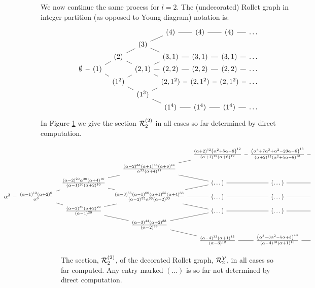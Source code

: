 \documentclass{article}
\theoremstyle{definition}
\numberwithin{equation}{subsection}
\begin{document}
We now continue the same process for $l=2$.
The (undecorated) Rollet graph in integer-partition (as opposed to Young diagram) notation is:
\[
\begin{tikzcd}[column sep=0.6em,row sep=0em]
&&&&(4)\ar[dash,r]&(4)\ar[dash,r]&(4)\ar[dash,r]&\dots\\
&&&(3)\ar[dash,ur]\ar[dash,dr]\\
&&(2)\arrow[dash,ur]\arrow[dash,dr]&& (3,1)\ar[dash,r]&(3,1)\ar[dash,r]&(3,1)\ar[dash,r]&\dots\\
\emptyset\arrow[dash,r] & (1)\arrow[dash,ur]\arrow[dash,dr] &&(2,1)\ar[dash,ur]\ar[dash,dr]\ar[dash,r]&(2,2)\ar[dash,r]&(2,2)\ar[dash,r]&(2,2)\ar[dash,r]&\dots\\
&&(1^2)\arrow[dash,ur]\arrow[dash,dr]&&(2,1^2)\ar[dash,r]&(2,1^2)\ar[dash,r]&(2,1^2)\ar[dash,r]&\dots\\
&&&(1^3)\ar[dash,dr]\ar[dash,ur]\\
&&&&(1^4)\ar[dash,r]&(1^4)\ar[dash,r]&(1^4)\ar[dash,r]&\dots
\end{tikzcd}
\]
In Figure \ref{fig:l2} we give the section ${\mathcal{R}}_2^{(2)}$ in all cases so far determined by direct computation. 
\begin{figure}
\[
\hspace{-3.51cm} \begin{tikzcd}[column sep=0.6em,row sep=0em]
&&&&\frac{(\alpha +2)^{12} \left(\alpha ^2+5 \alpha -8\right)^{12}}{(\alpha +1)^{12} (\alpha +6)^{12}}\ar[dash,r]&\frac{\left(\alpha ^4+7 \alpha ^3+\alpha ^2-23 \alpha -6\right)^{13}}{(\alpha +2)^{13} \left(\alpha ^2+5 \alpha -8\right)^{13}}\ar[dash,r]&{}\\
&&&\frac{(\alpha -2)^{33} (\alpha +1)^{44} (\alpha +6)^{11}}{\alpha ^{33} (\alpha +4)^{11}}\ar[dash,ur]\ar[dash,dr]\\
&&\frac{(\alpha -2)^{20} \alpha ^{30} (\alpha +4)^{10}}{(\alpha -1)^{20} (\alpha +2)^{10}}\arrow[dash,ur]\arrow[dash,dr]&& (\dots)\ar[dash,r]&(\dots)\ar[dash,r]&{}\\
\alpha ^3 \arrow[dash,r] & \frac{(\alpha -1)^{12} (\alpha +2)^6}{\alpha ^6} \arrow[dash,ur]\arrow[dash,dr] &&\frac{ (\alpha -3)^{55} (\alpha -1)^{66} (\alpha +1)^{55} (\alpha +4)^{33}}{ (\alpha -2)^{55} \alpha ^{33} (\alpha +2)^{33}}\ar[dash,ur]\ar[dash,dr]\ar[dash,r]&(\dots)\ar[dash,r]&(\dots)\ar[dash,r]&{}\\
&&\frac{(\alpha -2)^{30} (\alpha +2)^{20}}{(\alpha -1)^{20}}\arrow[dash,ur]\arrow[dash,dr]&&(\dots)\ar[dash,r]&(\dots)\ar[dash,r]&{}\\
&&&\frac{(\alpha -3)^{44} (\alpha +2)^{33}}{(\alpha -2)^{33}}\ar[dash,dr]\ar[dash,ur]\\
&&&&\frac{(\alpha -4)^{12} (\alpha +1)^{12}}{(\alpha -3)^{12}}\ar[dash,r]&\frac{\left(\alpha ^3-3 \alpha ^2-5 \alpha +3\right)^{13}}{(\alpha -4)^{13} (\alpha +1)^{13}}\ar[dash,r]&{}
\end{tikzcd}
\]
\caption{The section, ${\mathcal{R}}_2^{(2)}$, of the decorated Rollet graph, ${\mathcal{R}}^{{\mathcal V}}_2$, in all cases so far computed. Any entry marked $(\dots)$ is so far not determined by direct computation.
\label{fig:l2}}
\end{figure}
 
\end{document}

